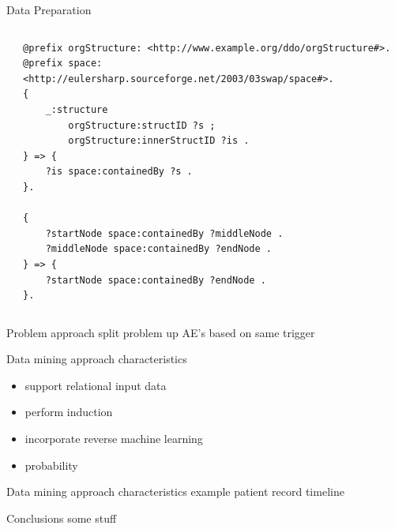 \documentclass{beamer}
\begin{document}
\begin{frame}[fragile]{Data Preparation}
\begin{columns}
\begin{column}{.3\textwidth}
\end{column}%
\hfill%
\begin{column}{.66\textwidth}
{\tiny
\begin{verbatim}
@prefix orgStructure: <http://www.example.org/ddo/orgStructure#>.
@prefix space: <http://eulersharp.sourceforge.net/2003/03swap/space#>.
{
    _:structure
        orgStructure:structID ?s ;
        orgStructure:innerStructID ?is .
} => {
    ?is space:containedBy ?s .
}.

{
    ?startNode space:containedBy ?middleNode .
    ?middleNode space:containedBy ?endNode .
} => {
    ?startNode space:containedBy ?endNode .
}.
\end{verbatim}
}
\end{column}%
\end{columns}
\end{frame}



\begin{frame}{Problem approach}
split problem  up AE's based on same trigger
\end{frame}

\begin{frame}{Data mining approach characteristics}
  \begin{itemize}
  \item support relational input data
  \item perform induction
  \item incorporate reverse machine learning
  \item probability
  \end{itemize}
\end{frame}

\begin{frame}{Data mining approach characteristics}
  example patient record timeline
\end{frame}


\begin{frame}{Conclusions}
  some stuff
\end{frame}





\end{document}
